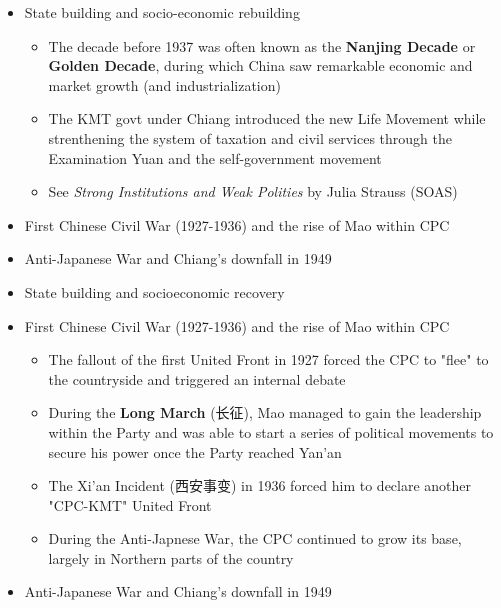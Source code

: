 \documentclass[
  10pt,
  ignorenonframetext,
]{beamer}
\begin{document}
\begin{frame}
\begin{itemize}
  \item State building and socio-economic rebuilding
  \vspace{0.1cm}
  \begin{itemize}
    \item The decade before 1937 was often known as the \textbf{Nanjing Decade} or \textbf{Golden Decade}, during which China saw remarkable economic and market growth (and industrialization)
    \item The KMT govt under Chiang introduced the new Life Movement while strenthening the system of taxation and civil services through the Examination Yuan and the self-government movement
    \item See \textit{Strong Institutions and Weak Polities} by Julia Strauss (SOAS)
  \end{itemize}
  \vspace{0.6cm}
  \item First Chinese Civil War (1927-1936) and the rise of Mao within CPC
  \vspace{0.6cm}
  \item Anti-Japanese War and Chiang's downfall in 1949
\end{itemize}
\end{frame}

\begin{frame}
\begin{itemize}
  \item State building and socioeconomic recovery
  \vspace{0.6cm}
  \item First Chinese Civil War (1927-1936) and the rise of Mao within CPC
  \vspace{0.1cm}
  \begin{itemize}
    \item The fallout of the first United Front in 1927 forced the CPC to "flee" to the countryside and triggered an internal debate
    \item During the \textbf{Long March} (长征), Mao managed to gain the leadership within the Party and was able to start a series of political movements to secure his power once the Party reached Yan'an
    \item The Xi'an Incident (西安事变) in 1936 forced him to declare another "CPC-KMT" United Front
    \item During the Anti-Japnese War, the CPC continued to grow its base, largely in Northern parts of the country 
  \end{itemize}
  \vspace{0.6cm}
  \item Anti-Japanese War and Chiang's downfall in 1949
\end{itemize}
\end{frame}
\end{document}
